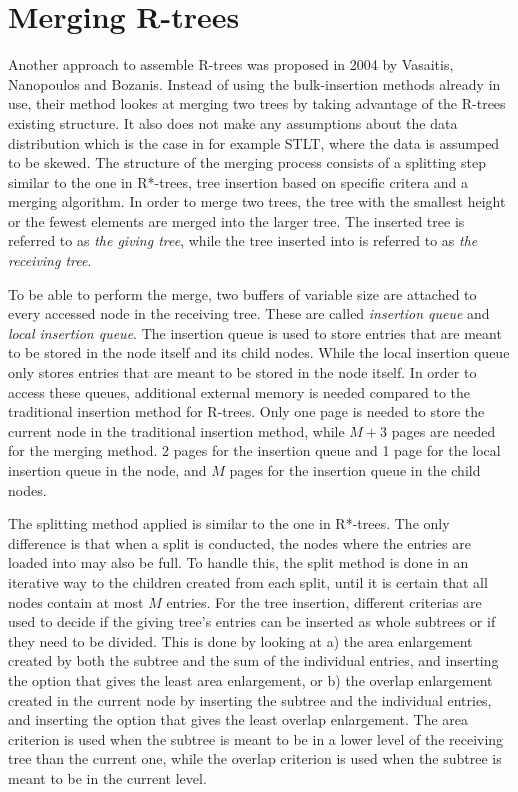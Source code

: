 \section{Merging R-trees}
Another approach to assemble R-trees was proposed in 2004 by Vasaitis, Nanopoulos and Bozanis\cite{MergingRtree}. Instead of using the bulk-insertion methods already in use, their method lookes at merging two trees by taking advantage of the R-trees existing structure. It also does not make any assumptions about the data distribution which is the case in for example STLT, where the data is assumped to be skewed\cite{STLT}. The structure of the merging process consists of a splitting step similar to the one in R*-trees, tree insertion based on specific critera and a merging algorithm. In order to merge two trees, the tree with the smallest height or the fewest elements are merged into the larger tree. The inserted tree is referred to as \emph{the giving tree}, while the tree inserted into is referred to as \emph{the receiving tree}. \newline

To be able to perform the merge, two buffers of variable size are attached to every accessed node in the receiving tree. These are called \emph{insertion queue} and \emph{local insertion queue}. The insertion queue is used to store entries that are meant to be stored in the node itself and its child nodes. While the local insertion queue only stores entries that are meant to be stored in the node itself. In order to access these queues, additional external memory is needed compared to the traditional insertion method for R-trees. Only one page is needed to store the current node in the traditional insertion method, while $M+3$ pages are needed for the merging method. 2 pages for the insertion queue and 1 page for the local insertion queue in the node, and $M$ pages for the insertion queue in the child nodes.\newline

The splitting method applied is similar to the one in R*-trees. The only difference is that when a split is conducted, the nodes where the entries are loaded into may also be full. To handle this, the split method is done in an iterative way to the children created from each split, until it is certain that all nodes contain at most $M$ entries. For the tree insertion, different criterias are used to decide if the giving tree's entries can be inserted as whole subtrees or if they need to be divided. This is done by looking at a) the area enlargement created by both the subtree and the sum of the individual entries, and inserting the option that gives the least area enlargement, or b) the overlap enlargement created in the current node by inserting the subtree and the individual entries, and inserting the option that gives the least overlap enlargement. The area criterion is used when the subtree is meant to be in a lower level of the receiving tree than the current one, while the overlap criterion is used when the subtree is meant to be in the current level.\newline

